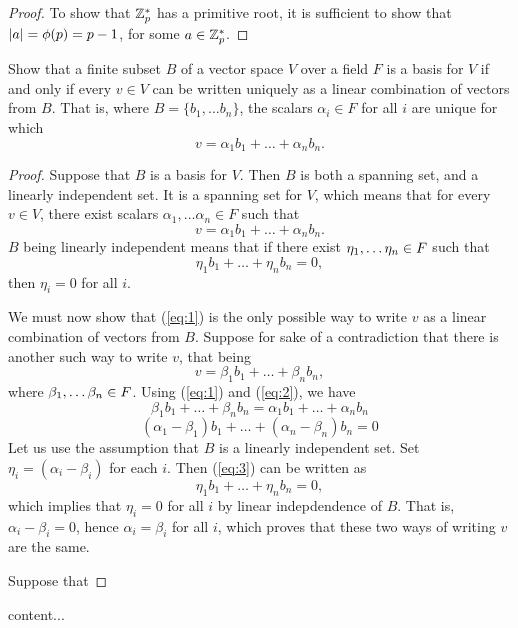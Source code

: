\documentclass[11pt]{article}
\begin{document}
\begin{proof}
To show that $ \mathbb{Z}_{p}^{*} $ has a primitive root, it is sufficient to show that $ |a| = \phi(p) = p-1 $, for some $ a \in \mathbb{Z}_{p}^{*} $.
\end{proof}

\begin{exercise}{3}
Show that a finite subset $ B $ of a vector space $ V $ over a field $ F $ is a basis for $ V $ if and only if every $ v \in V $ can be written uniquely as a linear combination of vectors from $ B $. That is, where $ B = \{b_{1}, \ldots b_{n}\} $, the scalars $ \alpha_{i} \in F $ for all $ i $ are unique for which
\[ v = \alpha_{1} b_{1} + \ldots + \alpha_{n} b_{n}. \]

\end{exercise}

\begin{proof}
\necessary Suppose that $ B $ is a basis for $ V $. Then $ B $ is both a spanning set, and a linearly independent set. It is a spanning set for $ V $, which means that for every $ v \in V $, there exist scalars $ \alpha_{1}, \dots \alpha_{n} \in F $ such that 
\begin{equation} \label{eq:1}
	v = \alpha_{1} b_{1} + \dots + \alpha_{n} b_{n}.
\end{equation}
$ B $ being linearly independent means that if there exist $ \eta_{1}, \dots \eta_{n} \in F $ such that
\[ \eta_{1} b_{1} + \dots + \eta_{n} b_{n} = 0, \]
then  $ \eta_{i} = 0 $ for all $ i $.

We must now show that (\ref{eq:1}) is the only possible way to write $ v $ as a linear combination of vectors from $ B $. Suppose for sake of a contradiction that there is another such way to write $ v $, that being
\begin{equation} \label{eq:2}
	v = \beta_{1} b_{1} + \dots + \beta_{n} b_{n},	
\end{equation}
where $ \beta_{1}, \dots \beta_{n} \in F $. Using (\ref{eq:1}) and (\ref{eq:2}), we have
\[ \beta_{1} b_{1} + \dots + \beta_{n} b_{n} = \alpha_{1} b_{1} + \dots + \alpha_{n} b_{n} \]
\begin{equation} \label{eq:3}
	(\alpha_{1} - \beta_{1}) b_{1} + \dots + (\alpha_{n} - \beta_{n}) b_{n} = 0 
\end{equation}
Let us use the assumption that $ B $ is a linearly independent set. Set $ \eta_{i} = (\alpha_{i}-  \beta_{i}) $ for each $ i $. Then (\ref{eq:3}) can be written as 
\[ \eta_{1} b_{1} +  \dots + \eta_{n} b_{n} = 0, \]
which implies that $ \eta_{i} = 0 $ for all $ i $ by linear indepdendence of $ B $. That is, $ \alpha_{i} - \beta_{i} = 0 $, hence $ \alpha_{i} = \beta_{i} $ for all $ i $, which proves that these two ways of writing $ v $ are the same.

\sufficient Suppose that
\end{proof}

\begin{exercise}{4}
content...
\end{exercise}
\end{document}
